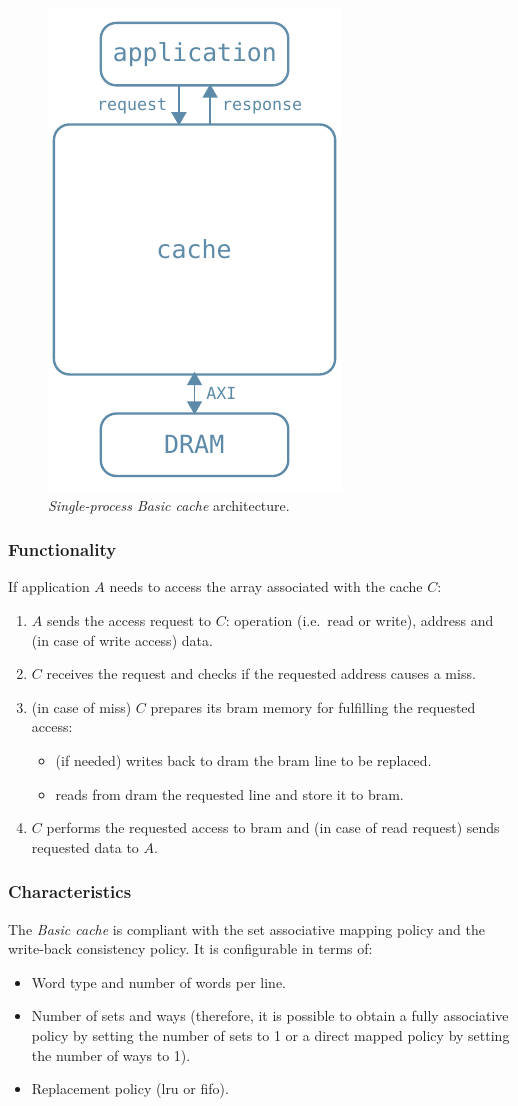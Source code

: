 \documentclass[11pt,a4paper,oneside]{memoir}
\begin{document}
\begin{figure}[!htb]
	\centering
	\includegraphics[width=.3\textwidth]{single_proc_basic_arch}
	\caption{\emph{Single-process Basic cache} architecture.}
	\label{fig:single_proc_basic_arch}
\end{figure}

\subsubsection{Functionality}
If application $A$ needs to access the array associated with the cache $C$:
\begin{enumerate}
	\item $A$ sends the access request to $C$: operation (i.e.\ read or
		write), address and (in case of write access) data.
	\item $C$ receives the request and checks if the requested address
		causes a miss.
	\item (in case of miss) $C$ prepares its \ac{bram} memory for fulfilling
		the requested access:
		\begin{itemize}
			\item (if needed) writes back to \ac{dram} the \ac{bram}
				line to be replaced.
			\item reads from \ac{dram} the requested line and store
				it to \ac{bram}.
		\end{itemize}
	\item $C$ performs the requested access to \ac{bram} and (in case of
		read request) sends requested data to $A$.
\end{enumerate}

\subsubsection{Characteristics}
The \emph{Basic cache} is compliant with the set associative mapping policy and
the write-back consistency policy.
It is configurable in terms of:
\begin{itemize}
	\item Word type and number of words per line.
	\item Number of sets and ways (therefore, it is possible to obtain a
		fully associative policy by setting the number of sets to 1 or
		a direct mapped policy by setting the number of ways to 1).
	\item Replacement policy (\acl{lru} or \acl{fifo}).
\end{itemize}
\end{document}
